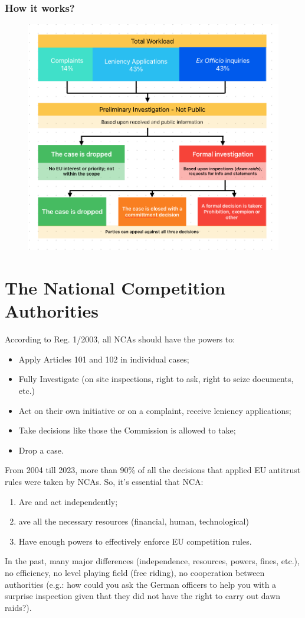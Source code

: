         \subsubsection{How it works?}

        \begin{figure}[h]
            \centering
            \includegraphics[width=0.50\linewidth]{graphics/L6-2_TotalWorkload.png}
        \end{figure}

\section{The National Competition Authorities}

    According to Reg. 1/2003, all NCAs should have the powers to:
    \begin{itemize}
        \item Apply Articles 101 and 102 in individual cases;
        \item Fully Investigate (on site inspections, right to ask, right to seize documents, etc.)
        \item Act on their own initiative or on a complaint, receive leniency applications;
        \item Take decisions like those the Commission is allowed to take;
        \item Drop a case.
    \end{itemize}
    
    From 2004 till 2023, more than 90\% of all the decisions that applied EU antitrust rules were taken by NCAs. So, it's essential that NCA:
    \begin{enumerate}
        \item Are and act independently;
        \item ave all the necessary resources (financial, human, technological)
        \item Have enough powers to effectively enforce EU competition rules.
    \end{enumerate}
    In the past, many major differences (independence, resources, powers, fines, etc.), no efficiency, no level playing field (free riding), no cooperation between authorities (e.g.: how could you ask the German officers to help you with a surprise inspection given that they did not have the right to carry out dawn raids?). 

